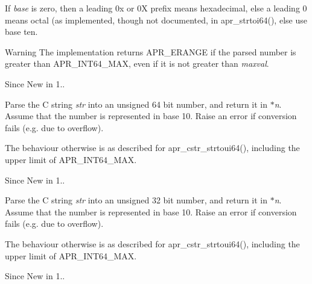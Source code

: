 If {\itshape base} is zero, then a leading \textquotesingle{}0x\textquotesingle{} or \textquotesingle{}0X\textquotesingle{} prefix means hexadecimal, else a leading \textquotesingle{}0\textquotesingle{} means octal (as implemented, though not documented, in apr\+\_\+strtoi64(), else use base ten.

\begin{DoxyWarning}{Warning}
The implementation returns A\+P\+R\+\_\+\+E\+R\+A\+N\+GE if the parsed number is greater than A\+P\+R\+\_\+\+I\+N\+T64\+\_\+\+M\+AX, even if it is not greater than {\itshape maxval}.
\end{DoxyWarning}
\begin{DoxySince}{Since}
New in 1..
\end{DoxySince}
Parse the C string {\itshape str} into an unsigned 64 bit number, and return it in {\itshape $\ast$n}. Assume that the number is represented in base 10. Raise an error if conversion fails (e.\+g. due to overflow).

The behaviour otherwise is as described for apr\+\_\+cstr\+\_\+strtoui64(), including the upper limit of A\+P\+R\+\_\+\+I\+N\+T64\+\_\+\+M\+AX.

\begin{DoxySince}{Since}
New in 1..
\end{DoxySince}
Parse the C string {\itshape str} into an unsigned 32 bit number, and return it in {\itshape $\ast$n}. Assume that the number is represented in base 10. Raise an error if conversion fails (e.\+g. due to overflow).

The behaviour otherwise is as described for apr\+\_\+cstr\+\_\+strtoui64(), including the upper limit of A\+P\+R\+\_\+\+I\+N\+T64\+\_\+\+M\+AX.

\begin{DoxySince}{Since}
New in 1.. 
\end{DoxySince}
